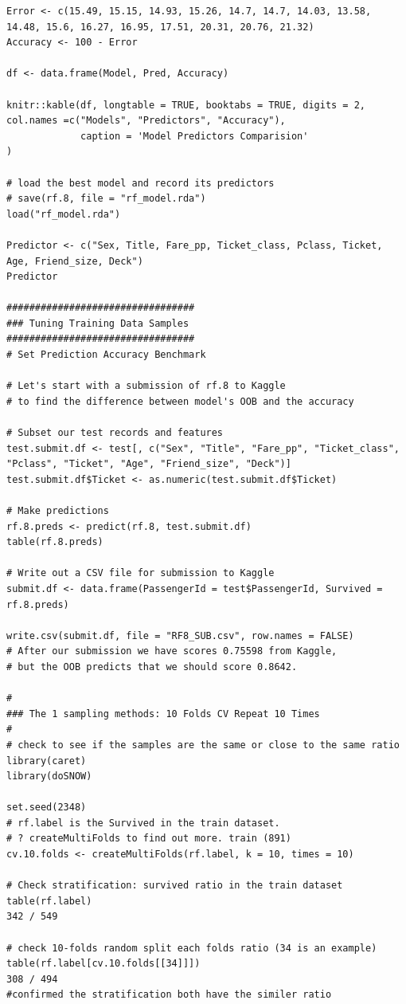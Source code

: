 \documentclass[
]{book}
\begin{document}
\begin{verbatim}
Error <- c(15.49, 15.15, 14.93, 15.26, 14.7, 14.7, 14.03, 13.58, 14.48, 15.6, 16.27, 16.95, 17.51, 20.31, 20.76, 21.32)
Accuracy <- 100 - Error

df <- data.frame(Model, Pred, Accuracy)

knitr::kable(df, longtable = TRUE, booktabs = TRUE, digits = 2, col.names =c("Models", "Predictors", "Accuracy"),
             caption = 'Model Predictors Comparision'
)

# load the best model and record its predictors
# save(rf.8, file = "rf_model.rda")
load("rf_model.rda")

Predictor <- c("Sex, Title, Fare_pp, Ticket_class, Pclass, Ticket, Age, Friend_size, Deck")
Predictor

#################################
### Tuning Training Data Samples
#################################
# Set Prediction Accuracy Benchmark

# Let's start with a submission of rf.8 to Kaggle
# to find the difference between model's OOB and the accuracy

# Subset our test records and features
test.submit.df <- test[, c("Sex", "Title", "Fare_pp", "Ticket_class", "Pclass", "Ticket", "Age", "Friend_size", "Deck")]
test.submit.df$Ticket <- as.numeric(test.submit.df$Ticket)

# Make predictions
rf.8.preds <- predict(rf.8, test.submit.df)
table(rf.8.preds)

# Write out a CSV file for submission to Kaggle
submit.df <- data.frame(PassengerId = test$PassengerId, Survived = rf.8.preds)

write.csv(submit.df, file = "RF8_SUB.csv", row.names = FALSE)
# After our submission we have scores 0.75598 from Kaggle,
# but the OOB predicts that we should score 0.8642.

#
### The 1 sampling methods: 10 Folds CV Repeat 10 Times
#
# check to see if the samples are the same or close to the same ratio
library(caret)
library(doSNOW)

set.seed(2348)
# rf.label is the Survived in the train dataset.
# ? createMultiFolds to find out more. train (891)
cv.10.folds <- createMultiFolds(rf.label, k = 10, times = 10)

# Check stratification: survived ratio in the train dataset
table(rf.label)
342 / 549

# check 10-folds random split each folds ratio (34 is an example)
table(rf.label[cv.10.folds[[34]]])
308 / 494
#confirmed the stratification both have the similer ratio


\end{verbatim}
\end{document}
